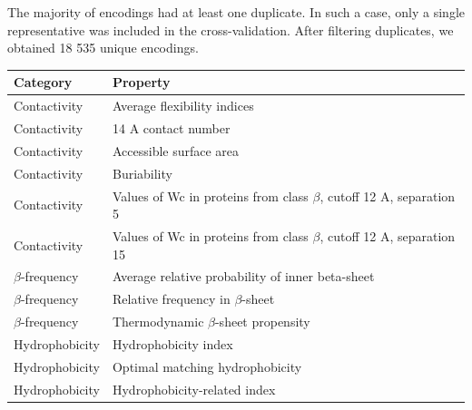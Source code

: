 \documentclass{bioinfo}
\begin{document}
\begin{methods}
  The majority of encodings had at least one duplicate. In such a case, only a 
single representative was included in the cross-validation. After filtering 
duplicates, we obtained 18 535 unique encodings.
\begin{table}[bth]
\begin{tabularx}{\columnwidth}{@{} lX @{}}
  \toprule
  Category & Property \\ 
  \midrule
  Contactivity & Average flexibility indices \newline \citep{bhaskaran_positional_1988} \\ 
  Contactivity & 14 A contact number \newline \citep{nishikawa_radial_1986} \\ 
  Contactivity & Accessible surface area \newline \citep{radzicka_comparing_1988} \\ 
  Contactivity & Buriability \newline  \citep{zhou_quantifying_2004} \\ 
  Contactivity & Values of Wc in proteins from class $\beta$, \newline  cutoff 12 A, separation 5 \newline \citep{wozniak_characteristics_2014} \\ 
  Contactivity & Values of Wc in proteins from class $\beta$, \newline  cutoff 12 A, separation 15 \newline \citep{wozniak_characteristics_2014} \\ 
  $\beta$-frequency & Average relative probability of inner beta-sheet \newline \citep{kanehisa_local_1980} \\ 
  $\beta$-frequency & Relative frequency in $\beta$-sheet \newline \citep{prabhakaran_distribution_1990} \\ 
  $\beta$-frequency & Thermodynamic $\beta$-sheet propensity \newline \citep{kim_thermodynamic_1993} \\ 
  Hydrophobicity & Hydrophobicity index \newline \citep{argos_structural_1982} \\ 
  Hydrophobicity & Optimal matching hydrophobicity \newline \citep{sweet_correlation_1983} \\ 
  Hydrophobicity & Hydrophobicity-related index \newline \citep{kidera_statistical_1985} \\ 

\end{tabularx}
\end{table}
\end{methods}
\end{document}
